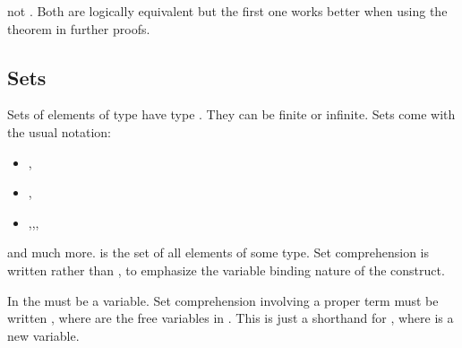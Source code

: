 \begin{isabellebody}
\begin{isamarkuptext}
\begin{warn}
not . Both are logically equivalent
but the first one works better when using the theorem in further proofs.
\end{warn}

\subsection{Sets}

Sets of elements of type  have type .
They can be finite or infinite. Sets come with the usual notation:
\begin{itemize}
\item {},\quad {}
\item {},\quad {}
\item {},\quad {},\quad {},\quad {}
\end{itemize}
and much more.  is the set of all elements of some type.
Set comprehension is written 
rather than , to emphasize the variable binding nature
of the construct.
\begin{warn}
In  the  must be a variable. Set comprehension
involving a proper term  must be written
,
where  are the free variables in .
This is just a shorthand for , where
 is a new variable.
\end{warn}


\end{isamarkuptext}
\end{isabellebody}
